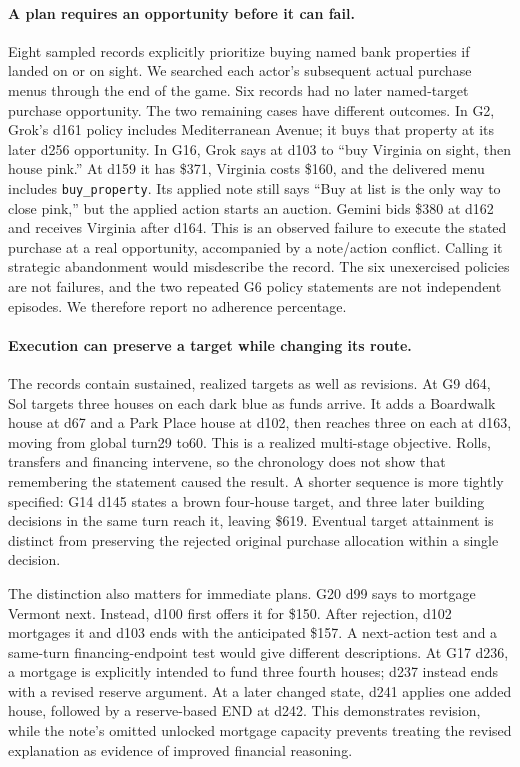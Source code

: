 \paragraph{A plan requires an opportunity before it can fail.}
Eight sampled records explicitly prioritize buying named bank properties if landed on or on sight. We searched each actor's subsequent actual purchase menus through the end of the game. Six records had no later named-target purchase opportunity. The two remaining cases have different outcomes. In G2, Grok's d161 policy includes Mediterranean Avenue; it buys that property at its later d256 opportunity. In G16, Grok says at d103 to ``buy Virginia on sight, then house pink.'' At d159 it has \$371, Virginia costs \$160, and the delivered menu includes \texttt{buy\_property}. Its applied note still says ``Buy at list is the only way to close pink,'' but the applied action starts an auction. Gemini bids \$380 at d162 and receives Virginia after d164. This is an observed failure to execute the stated purchase at a real opportunity, accompanied by a note/action conflict. Calling it strategic abandonment would misdescribe the record. The six unexercised policies are not failures, and the two repeated G6 policy statements are not independent episodes. We therefore report no adherence percentage.

\paragraph{Execution can preserve a target while changing its route.}
The records contain sustained, realized targets as well as revisions. At G9 d64, Sol targets three houses on each dark blue as funds arrive. It adds a Boardwalk house at d67 and a Park Place house at d102, then reaches three on each at d163, moving from global turn29 to60. This is a realized multi-stage objective. Rolls, transfers and financing intervene, so the chronology does not show that remembering the statement caused the result. A shorter sequence is more tightly specified: G14 d145 states a brown four-house target, and three later building decisions in the same turn reach it, leaving \$619. Eventual target attainment is distinct from preserving the rejected original purchase allocation within a single decision.

The distinction also matters for immediate plans. G20 d99 says to mortgage Vermont next. Instead, d100 first offers it for \$150. After rejection, d102 mortgages it and d103 ends with the anticipated \$157. A next-action test and a same-turn financing-endpoint test would give different descriptions. At G17 d236, a mortgage is explicitly intended to fund three fourth houses; d237 instead ends with a revised reserve argument. At a later changed state, d241 applies one added house, followed by a reserve-based END at d242. This demonstrates revision, while the note's omitted unlocked mortgage capacity prevents treating the revised explanation as evidence of improved financial reasoning.

